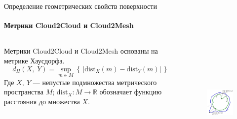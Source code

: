 \documentclass[aspectratio=169,xcolor=table]{beamer}
\newcommand{\fbckg}[1]{\usebackgroundtemplate{\texttt{[image: \#1]}}}%
\begin{document}
\begin{frame}[t]{Определение геометрических свойств поверхности}
    \framesubtitle{Метрики Cloud2Cloud и Cloud2Mesh}


    \begin{columns}[T,onlytextwidth]
        \begin{column}{0.49\textwidth}
            Метрики Cloud2Cloud и Cloud2Mesh основаны на метрике Хаусдорфа.
            \begin{equation*}
                d_{H}(X,\;Y)=\sup _{m\in M}\left\{\,|\mathrm {dist} _{X}(m)-\mathrm {dist} _{Y}(m)|\,\right\}
            \end{equation*}
            Где $X,\ Y$ --- непустые подмножества метрического пространства $M$; $\mathrm {dist} _{X}\colon M\to \mathbb {R}$ обозначает функцию расстояния до множества $X$.
        \end{column}
        \begin{column}{0.49\textwidth}
            \vspace{-0.8cm}
            \begin{figure}[H]
                \centering\includegraphics[height=6cm,width=1\textwidth,keepaspectratio]{Hausdorff_distance_sample.svg.png}
                \label{fig:Hausdorff_distance_sample.svg.png}
            \end{figure}
        \end{column}
    \end{columns}
\end{frame}

\end{document}
